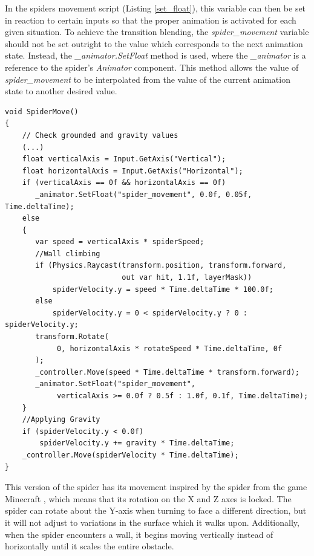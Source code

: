 In the spiders movement script (Listing \ref{set_float}), this variable can then
be set in reaction to certain inputs so that the proper animation is activated
for each given situation. To achieve the transition blending, the
\textit{spider\_movement} variable should not be set outright to the value which
corresponds to the next animation state. Instead, the
\textit{\_animator.SetFloat} method is used, where the \textit{\_animator} is
a reference to the spider's \textit{Animator} component. This method allows the
value of \textit{spider\_movement} to be interpolated from the value of the
current animation state to another desired value.
\newline
\begin{lstlisting}[basicstyle=\linespread{0.9}\footnotesize\ttfamily, numbers=none,frame=single,
caption={Moving the baked version of the spider, and playing the appropriate
animations by setting the \textit{spider\_movement} variable using the
\textit{\_animator.SetFloat()} method.
\textit{BakedSpiderMovement.cs}},captionpos=t, label=set_float,
language={[Sharp]c}, float=tp]
void SpiderMove()
{
    // Check grounded and gravity values
    (...)
    float verticalAxis = Input.GetAxis("Vertical");
    float horizontalAxis = Input.GetAxis("Horizontal");
    if (verticalAxis == 0f && horizontalAxis == 0f)
       _animator.SetFloat("spider_movement", 0.0f, 0.05f, Time.deltaTime);
    else
    {
       var speed = verticalAxis * spiderSpeed;
       //Wall climbing
       if (Physics.Raycast(transform.position, transform.forward, 
                           out var hit, 1.1f, layerMask))
           spiderVelocity.y = speed * Time.deltaTime * 100.0f;
       else
           spiderVelocity.y = 0 < spiderVelocity.y ? 0 : spiderVelocity.y;
       transform.Rotate(
            0, horizontalAxis * rotateSpeed * Time.deltaTime, 0f
       );
       _controller.Move(speed * Time.deltaTime * transform.forward);
       _animator.SetFloat("spider_movement", 
            verticalAxis >= 0.0f ? 0.5f : 1.0f, 0.1f, Time.deltaTime);
    }
    //Applying Gravity
    if (spiderVelocity.y < 0.0f)
        spiderVelocity.y += gravity * Time.deltaTime;
    _controller.Move(spiderVelocity * Time.deltaTime);
}
\end{lstlisting}

This version of the spider has its movement inspired by the spider from the game
Minecraft \cite{minecraft}, which means that its rotation on the X and Z axes is locked. The
spider can rotate about the Y-axis when turning to face a different direction,
but it will not adjust to variations in the surface which it walks upon.
Additionally, when the spider encounters a wall, it begins moving
vertically instead of horizontally until it scales the entire obstacle.\\


